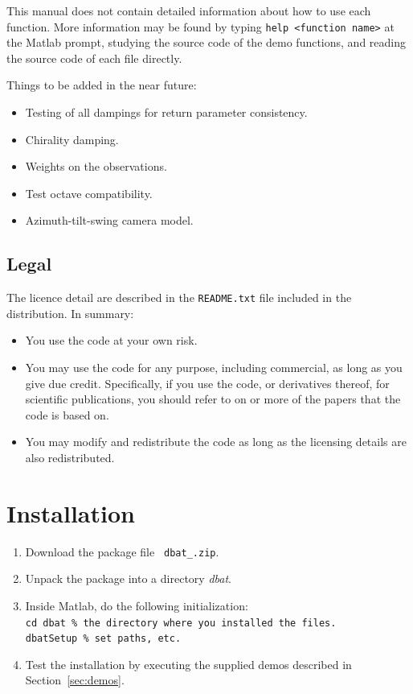 \documentclass{article}
\begin{document}
This manual does not contain detailed information about how to use
each function. More information may be found by typing \texttt{help
  <function name>} at the Matlab prompt, studying the source code of
the demo functions, and reading the source code of each file directly.

Things to be added in the near future:
\begin{itemize}
\item Testing of all dampings for return parameter consistency.
\item Chirality damping.
\item Weights on the observations.
\item Test octave compatibility.
\item Azimuth-tilt-swing camera model.
\end{itemize}

\subsection{Legal}

The licence detail are described in the \texttt{README.txt} file
included in the distribution. In summary:
\begin{itemize}
\item You use the code at your own risk.
\item You may use the code for any purpose, including commercial, as
  long as you give due credit. Specifically, if you use the code, or
  derivatives thereof, for scientific publications, you should refer
  to on or more of the papers
  \citet{Borlin2013:Bundle,Borlin2013:Experiments,Borlin2014:Camera}
  that the code is based on.
\item You may modify and redistribute the code as long as the
  licensing details are also redistributed.
\end{itemize}

\section{Installation}
\label{sec:install}

\begin{enumerate}
\item Download the package file {\tt
  \verb+dbat_+\dbatversion\verb+.zip+}.
\item Unpack the package into a directory \emph{dbat}.
\item \label{step:dbatInit}
Inside Matlab, do the following initialization:\\
\verb+cd dbat % the directory where you installed the files.+\\
\verb+dbatSetup % set paths, etc.+
\item Test the installation by executing the supplied demos described
  in Section~\ref{sec:demos}.
\end{enumerate}
\end{document}
